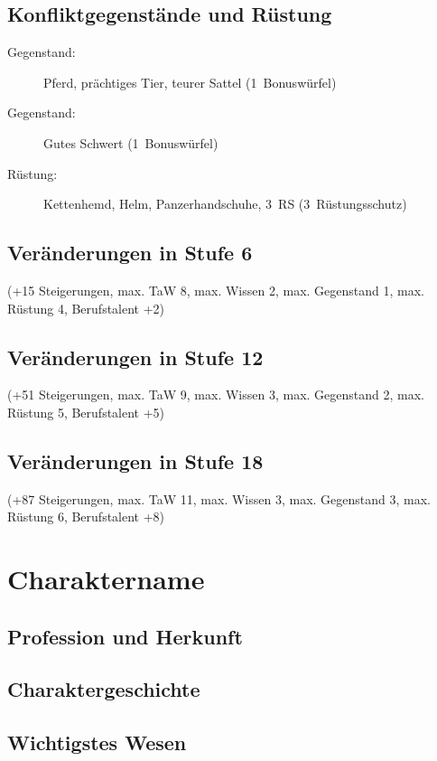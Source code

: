 \subsection{Konfliktgegenstände und Rüstung}
\begin{description}
\item[Gegenstand:] Pferd, prächtiges Tier, teurer Sattel (1~Bonuswürfel)
\item[Gegenstand:] Gutes Schwert (1~Bonuswürfel)
\item[Rüstung:] Kettenhemd, Helm, Panzerhandschuhe, 3~RS (3~Rüstungsschutz)
\end{description}

\subsection{Veränderungen in Stufe 6}
(+15 Steigerungen, max. TaW 8, max. Wissen 2, max. Gegenstand 1, max. Rüstung 4, Berufstalent +2)

\subsection{Veränderungen in Stufe 12}
(+51 Steigerungen, max. TaW 9, max. Wissen 3, max. Gegenstand 2, max. Rüstung 5, Berufstalent +5)

\subsection{Veränderungen in Stufe 18}
(+87 Steigerungen, max. TaW 11, max. Wissen 3, max. Gegenstand 3, max. Rüstung 6, Berufstalent +8)




\newpage\section{Charaktername}\label{Charaktername}
\subsection{Profession und Herkunft}

\subsection{Charaktergeschichte}

\subsection{Wichtigstes Wesen}


